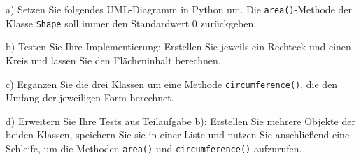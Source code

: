 \documentclass[11pt, a4paper, oneside]{article}
\begin{document}
	
	
	
	a) Setzen Sie folgendes UML-Diagramm in Python um.
	Die \texttt{area()}-Methode der Klasse \texttt{Shape} soll immer den Standardwert 0 zurückgeben.
	
	\begin{figure}[h]
		\centering
	\end{figure}
	
	b) Testen Sie Ihre Implementierung:
	Erstellen Sie jeweils ein Rechteck und einen Kreis und lassen Sie den Flächeninhalt berechnen.
	
	c) Ergänzen Sie die drei Klassen um eine Methode \texttt{circumference()}, die den Umfang der jeweiligen Form berechnet.
	
	d) Erweitern Sie Ihre Tests aus Teilaufgabe b): Erstellen Sie mehrere Objekte der beiden Klassen, speichern Sie sie in einer Liste und nutzen Sie anschließend eine Schleife, um die Methoden \texttt{area()} und \texttt{circumference()} aufzurufen.
	
\end{document}
